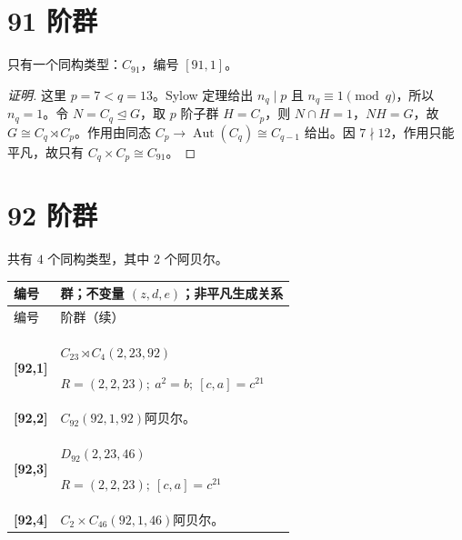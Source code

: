 \documentclass[UTF8,fontset=fandol,11pt,a4paper]{ctexart}
\newcommand{\Aut}{\operatorname{Aut}}\newcommand{\GL}{\operatorname{GL}}\newcommand{\ord}{\operatorname{ord}}\newcommand{\Z}{\mathrm Z}
\begin{document}
\section*{91 阶群}\label{order:91}

只有一个同构类型：$C_{91}$，编号 $[91,1]$。

\begin{proof}[证明]
这里 $p=7<q=13$。Sylow 定理给出 $n_q\mid p$ 且 $n_q\equiv1\pmod q$，所以 $n_q=1$。令 $N=C_q\trianglelefteq G$，取 $p$ 阶子群 $H=C_p$，则 $N\cap H=1$，$NH=G$，故 $G\cong C_q\rtimes C_p$。作用由同态 $C_p\to\Aut(C_q)\cong C_{q-1}$ 给出。因 $7\nmid 12$，作用只能平凡，故只有 $C_q\times C_p\cong C_{91}$。
\end{proof}

\section*{92 阶群}\label{order:92}

共有 $4$ 个同构类型，其中 $2$ 个阿贝尔。

\begingroup\small\setlength{\tabcolsep}{3pt}\renewcommand{\arraystretch}{1.12}

\begin{longtable}{@{}p{17mm}>{\raggedright\arraybackslash}p{141mm}@{}}

\toprule 编号 & 群；不变量 $(z,d,e)$；非平凡生成关系\\\midrule\endfirsthead

\toprule 编号 & 92 阶群（续）\\\midrule\endhead\bottomrule\endfoot

\textbf{[92,1]} & $C_{23}\rtimes C_{4}$\quad $(2,23,92)$\par\(R=(2,2,23);\allowbreak\ a^{2}=b;\allowbreak\ [c,a]=c^{21}\)\\[3pt]

\textbf{[92,2]} & $C_{92}$\quad $(92,1,92)$\quad 阿贝尔。\\[3pt]

\textbf{[92,3]} & $D_{92}$\quad $(2,23,46)$\par\(R=(2,2,23);\allowbreak\ [c,a]=c^{21}\)\\[3pt]

\textbf{[92,4]} & $C_{2}\times C_{46}$\quad $(92,1,46)$\quad 阿贝尔。\\[3pt]

\end{longtable}\endgroup
\end{document}
